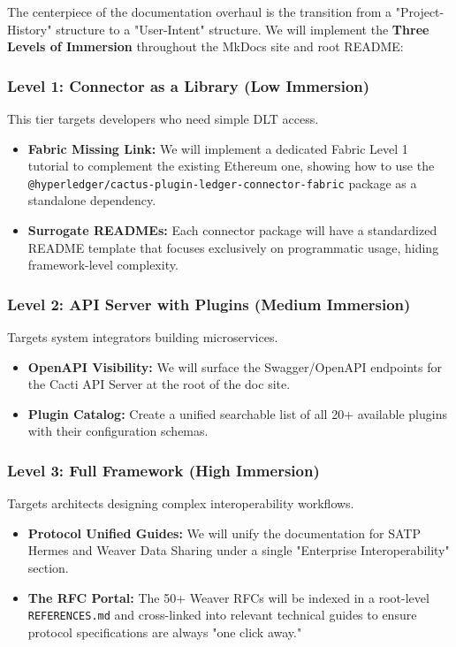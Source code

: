 The centerpiece of the documentation overhaul is the transition from a "Project-History" structure to a "User-Intent" structure. We will implement the \textbf{Three Levels of Immersion} throughout the MkDocs site and root README:

\subsubsection{Level 1: Connector as a Library (Low Immersion)}
This tier targets developers who need simple DLT access. 
\begin{itemize}
    \item \textbf{Fabric Missing Link:} We will implement a dedicated Fabric Level 1 tutorial to complement the existing Ethereum one, showing how to use the \texttt{@hyperledger/cactus-plugin-ledger-connector-fabric} package as a standalone dependency.
    \item \textbf{Surrogate READMEs:} Each connector package will have a standardized README template that focuses exclusively on programmatic usage, hiding framework-level complexity.
\end{itemize}

\subsubsection{Level 2: API Server with Plugins (Medium Immersion)}
Targets system integrators building microservices.
\begin{itemize}
    \item \textbf{OpenAPI Visibility:} We will surface the Swagger/OpenAPI endpoints for the Cacti API Server at the root of the doc site.
    \item \textbf{Plugin Catalog:} Create a unified searchable list of all 20+ available plugins with their configuration schemas.
\end{itemize}

\subsubsection{Level 3: Full Framework (High Immersion)}
Targets architects designing complex interoperability workflows.
\begin{itemize}
    \item \textbf{Protocol Unified Guides:} We will unify the documentation for SATP Hermes and Weaver Data Sharing under a single "Enterprise Interoperability" section.
    \item \textbf{The RFC Portal:} The 50+ Weaver RFCs will be indexed in a root-level \texttt{REFERENCES.md} and cross-linked into relevant technical guides to ensure protocol specifications are always "one click away."
\end{itemize}

